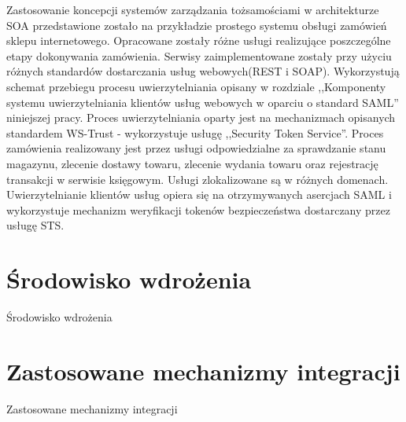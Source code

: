 		Zastosowanie koncepcji systemów zarządzania tożsamościami w architekturze SOA przedstawione zostało na przykładzie prostego systemu obsługi zamówień sklepu internetowego. Opracowane zostały różne usługi realizujące poszczególne etapy dokonywania zamówienia. Serwisy zaimplementowane zostały przy użyciu różnych standardów dostarczania usług webowych(REST i SOAP). Wykorzystują schemat przebiegu procesu uwierzytelniania opisany w rozdziale ,,Komponenty systemu uwierzytelniania klientów usług webowych w oparciu o standard SAML'' niniejszej pracy. Proces uwierzytelniania oparty jest na mechanizmach opisanych standardem WS-Trust - wykorzystuje usługę ,,Security Token Service''. Proces zamówienia realizowany jest przez usługi odpowiedzialne za sprawdzanie stanu magazynu, zlecenie dostawy towaru, zlecenie wydania towaru  oraz rejestrację transakcji w serwisie księgowym. Usługi zlokalizowane są w różnych domenach. Uwierzytelnianie klientów usług opiera się na otrzymywanych asercjach SAML i wykorzystuje mechanizm weryfikacji tokenów bezpieczeństwa dostarczany przez usługę STS. 



\section{Środowisko wdrożenia}
\label{sec:srodowiskoWdrozenia}

Środowisko wdrożenia


\section{Zastosowane mechanizmy integracji}
\label{sec:integracja}

Zastosowane mechanizmy integracji

